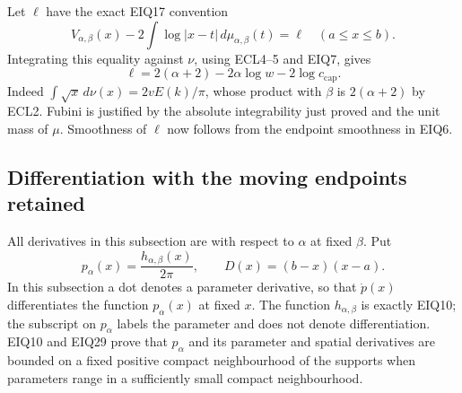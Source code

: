 \documentclass[11pt,a4paper]{article}
\begin{document}
Let $\ell$ have the exact EIQ17 convention
\[
V_{\alpha,\beta}(x)
-2\int\log|x-t|\,d\mu_{\alpha,\beta}(t)=\ell
\quad(a\leq x\leq b).
\]
Integrating this equality against $\nu$, using ECL4--5 and
EIQ7, gives
\begin{equation}\tag{ECL6}
\boxed{\displaystyle
\ell=2(\alpha+2)-2\alpha\log w-2\log c_{\mathrm{cap}}.}
\end{equation}
Indeed $\int\sqrt{x}\,d\nu(x)=2vE(k)/\pi$, whose product with
$\beta$ is $2(\alpha+2)$ by ECL2. Fubini is justified by the
absolute integrability just proved and the unit mass of $\mu$.
Smoothness of $\ell$ now follows from the endpoint smoothness in EIQ6.

\subsection{Differentiation with the moving endpoints retained}

All derivatives in this subsection are with respect to $\alpha$ at
fixed $\beta$. Put
\[
p_\alpha(x)=\frac{h_{\alpha,\beta}(x)}{2\pi},\qquad
D(x)=(b-x)(x-a).
\]
In this subsection a dot denotes a parameter derivative, so that
$\dot p(x)$ differentiates the function $p_\alpha(x)$ at fixed $x$.
The function $h_{\alpha,\beta}$ is exactly EIQ10; the subscript on
$p_\alpha$ labels the parameter and does not denote differentiation.
EIQ10 and EIQ29 prove that $p_\alpha$ and its parameter and spatial
derivatives are bounded on a fixed positive compact neighbourhood
of the supports when parameters range in a sufficiently small
compact neighbourhood.
\end{document}
